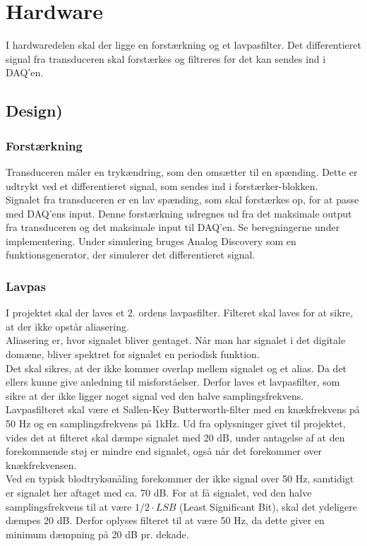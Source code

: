 \section{Hardware}
I hardwaredelen skal der ligge en forstærkning og et lavpasfilter. Det differentieret signal fra transduceren skal forstærkes og filtreres før det kan sendes ind i DAQ'en.

\subsection{Design)}
\subsubsection{Forstærkning}
Transduceren måler en trykændring, som den omsætter til en spænding. Dette er udtrykt ved et differentieret signal, som sendes ind i forstærker-blokken. \\
Signalet fra transduceren er en lav spænding, som skal forstærkes op, for at passe med DAQ'ens input. Denne forstærkning udregnes ud fra det maksimale output fra transduceren og det maksimale input til DAQ'en. Se beregningerne under implementering.  
\newline
Under simulering bruges Analog Discovery som en funktionsgenerator, der simulerer det differentieret signal.  

\subsubsection{Lavpas}
I projektet skal der laves et 2. ordens lavpasfilter. Filteret skal laves for at sikre, at der ikke opstår aliasering.\\
Aliasering \cite{DSB} er, hvor signalet bliver gentaget. Når man har signalet i det digitale domæne, bliver spektret for signalet en periodisk funktion.\\
Det skal sikres, at der ikke kommer overlap mellem signalet og et alias. Da det ellers kunne give anledning til misforståelser. Derfor laves et lavpasfilter, som sikre at der ikke ligger noget signal ved den halve samplingsfrekvens.\\
Lavpasfilteret skal være et Sallen-Key Butterworth-filter med en knækfrekvens på 50 Hz og en samplingsfrekvens på 1kHz. Ud fra oplysninger givet til projektet, vides det at filteret skal dæmpe signalet med 20 dB, under antagelse af at den forekommende støj er mindre end signalet, også når det forekommer over knækfrekvensen.\\
Ved en typisk blodtryksmåling forekommer der ikke signal over 50 Hz, samtidigt er signalet her aftaget med ca. 70 dB. For at få signalet, ved den halve samplingsfrekvens til at være $ 1/2 \cdot LSB $ (Least Significant Bit), skal det ydeligere dæmpes 20 dB. Derfor oplyses filteret til at være 50 Hz, da dette giver en minimum dæmpning på 20 dB pr. dekade.

